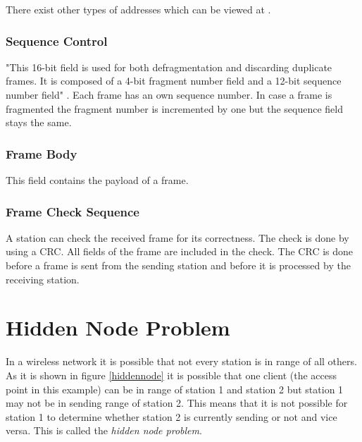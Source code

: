 There exist other types of addresses which can be viewed at \cite{mac_meaning}.

\subsubsection{Sequence Control}

"This 16-bit field is used for both defragmentation and discarding duplicate frames. It is composed of a 4-bit fragment number field and a 12-bit sequence number field" \cite[p.52]{80211wireless}. Each frame has an own sequence number. In case a frame is fragmented the fragment number is incremented by one but the sequence field stays the same.

\subsubsection{Frame Body}

This field contains the payload of a frame.

\subsubsection{Frame Check Sequence}

A station can check the received frame for its correctness. The check is done by using a \ac{CRC}. All fields of the frame are included in the check. The CRC is done before a frame is sent from the sending station and before it is processed by the receiving station. %

\section{Hidden Node Problem}
\label{sec:hidden_node_problem}

In a wireless network it is possible that not every station is in range of all others. As it is shown in figure \ref{hiddennode} it is possible that one client (the access point in this example) can be in range of station 1 and station 2 but station 1 may not be in sending range of station 2. This means that it is not possible for station 1 to determine whether station 2 is currently sending or not and vice versa. This is called the {\em hidden node problem}.


